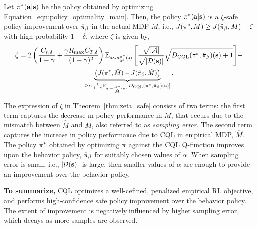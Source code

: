 \begin{theorem}
\label{thm:zeta_safe}
Let $\pi^*(\mathbf{a}|\mathbf{s})$ be the policy obtained by optimizing Equation~\ref{eqn:policy_optimality_main}. Then, the policy $\pi^*(\mathbf{a}|\mathbf{s})$ is a $\zeta$-safe policy improvement over $\hat{\pi}_\beta$ in the actual MDP $M$, i.e., $J(\pi^*, M) \geq J(\hat{\pi}_\beta, M) - \zeta$ with high probability $1 - \delta$, where $\zeta$ is given by,
\begin{multline}
    \label{eqn:performance_relation}
    \small{\zeta = 2\left({\frac{C_{r, \delta}}{1 - \gamma} + \frac{\gamma R_{\max} C_{T, \delta}}{(1 - \gamma)^2}}  \right) \mathbb{E}_{\mathbf{s}\sim d^{\pi^*}_{\hat{M}}(\mathbf{s})}\left[ \frac{\sqrt{|\mathcal{A}|}}{\sqrt{|\mathcal{D}(\mathbf{s})|}} \sqrt{ D_{\text{CQL}}(\pi^*, \hat{\pi}_\beta)(\mathbf{s}) + 1} \right]} - \\ \small{\underbrace{\left( J(\pi^*, \hat{M}) - J(\hat{\pi}_\beta, \hat{M})  \right)}_{\geq \alpha \frac{1}{1 - \gamma} \mathbb{E}_{\mathbf{s}\sim d^{\pi^*}_{\hat{M}}(\mathbf{s})}\left[D_{\text{CQL}}(\pi^*, \hat{\pi}_\beta)(\mathbf{s}) \right]}.}
\end{multline}
\end{theorem}
The expression of $\zeta$ in Theorem~\ref{thm:zeta_safe} consists of two terms: the first term captures the decrease in policy performance in $M$, that occurs due to the mismatch between $\hat{M}$ and $M$, also referred to as \emph{sampling error}. The second term captures the increase in policy performance due to CQL in empirical MDP, $\hat{M}$. The policy $\pi^*$ obtained by optimizing $\pi$ against the CQL Q-function improves upon the behavior policy, $\hat{\pi}_\beta$ for suitably chosen values of $\alpha$. When sampling error is small, i.e., $|\mathcal{D}(\mathbf{s})|$ is large, then smaller values of $\alpha$ are enough to provide an improvement over the behavior policy. 

\textbf{To summarize,} CQL optimizes a well-defined, penalized empirical RL objective, and performs high-confidence safe policy improvement over the behavior policy. The extent of improvement is negatively influenced by higher sampling error, which decays as more samples are observed.  

\vspace{-7pt}

